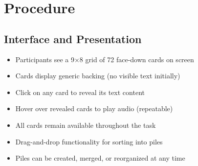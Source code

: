 \documentclass[12pt]{article}
\begin{document}
\section{Procedure}
\subsection{Interface and Presentation}
\begin{itemize}
\item Participants see a 9×8 grid of 72 face-down cards on screen
\item Cards display generic backing (no visible text initially)
\item Click on any card to reveal its text content
\item Hover over revealed cards to play audio (repeatable)
\item All cards remain available throughout the task
\item Drag-and-drop functionality for sorting into piles
\item Piles can be created, merged, or reorganized at any time
\end{itemize}
\end{document}
